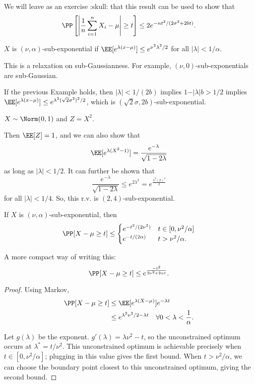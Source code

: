 We will leave as an exercise :skull: that this result can be used to show that 
\[\PP\left[\left\vert\frac{1}{n}\sum_{i=1}^n X_i - \mu\right\vert\geq t\right]\leq 2e^{-nt^2/(2\sigma^2 + 2bt)}.\] 

\begin{definition}

$X$ is $(\nu, \alpha)$-sub-exponential if $\EE[e^{\lambda(x-\mu)}] \leq e^{\nu^2\lambda^2/2}$ for all $\vert \lambda\vert < 1/\alpha$.   
\end{definition}

This is a relaxation on sub-Gaussianness. For example, $(\nu, 0)$-sub-exponentials are sub-Gaussian.

\begin{example}
\exlabel

If the previous Example holds, then $\vert \lambda\vert < 1/(2b)$ implies $1-\vert \lambda\vert b > 1/2$ implies $\EE[e^{\lambda(x-\mu)}]\leq e^{\lambda^2(\sqrt{2}\sigma^2)^2 / 2}$, which is $(\sqrt{2}\sigma, 2b)$-sub-exponential. 
\end{example}

\begin{example}
\exlabel

\Let $X\sim \Norm(0,1)$ and $Z=X^2$. 
\end{example}

Then $\EE[Z] = 1$, and we can also show that 
\[\EE[e^{\lambda(X^2-1)}] = \frac{e^{-\lambda}}{\sqrt{1-2\lambda}}\] 
as long as $\vert \lambda\vert < 1/2$. It can further be shown that 
\[\frac{e^{-\lambda}}{\sqrt{1-2\lambda}} \leq e^{2\lambda^2} = e^{\frac{\lambda^2(2)^2}{2}}\]
for all $\vert \lambda\vert < 1/4$. So, this r.v. is $(2,4)$-sub-exponential. 

\begin{theorem}
\proplabel

If $X$ is $(\nu, \alpha)$-sub-exponential, then 
\[\PP[X-\mu\geq t] \leq \begin{cases}
	e^{-t^2/(2\nu^2)} & t\in [0, \nu^2/\alpha] \\
	e^{-t/(2\alpha)} & t > \nu^2/\alpha.
\end{cases}\] 
\end{theorem}

A more compact way of writing this: 
\[\PP[X-\mu\geq t] \leq e^{\frac{-t^2}{2\nu^2 + 2\alpha t}}. \] 

\begin{proof}
Using Markov, 
\begin{align*}
\PP[X-\mu\geq t] &\leq \EE[e^{\lambda(X-\mu)}]e^{-\lambda t} \\
								 &\leq e^{\lambda^2\nu^2/2 - \lambda t}\quad \forall 0 < \lambda < \frac{1}{\alpha}. 
\end{align*}

Let $g(\lambda)$ be the exponent. $g'(\lambda) = \lambda\nu^2 - t$, so the unconstrained optimum occurs at $\lambda^* = t / \nu^2$. This unconstrained optimum is achievable precisely when $t\in [0, \nu^2/\alpha]$; plugging in this value gives the first bound. When $t > \nu^2/\alpha$, we can choose the boundary point closest to this unconstrained optimum, giving the second bound.  
\end{proof}


